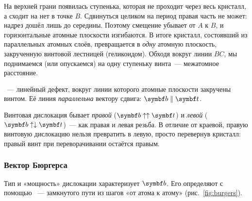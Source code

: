 На верхней грани появилась ступенька, которая не проходит через весь
кристалл, а сходит на нет в точке $B$. Сдвинуться целиком на период
правая часть не может: надрез дошёл лишь до середины. Поэтому смещение
убывает от $A$ к $B$, и горизонтальные атомные плоскости изгибаются. В
итоге кристалл, состоявший из параллельных атомных слоёв, превращается
в \emph{одну} атомную плоскость, закрученную винтовой лестницей
(геликоидом). Обходя вокруг линии $BC$, мы поднимаемся (или опускаемся)
на одну ступеньку винта~— межатомное расстояние.

\begin{opredelenie}
~— линейный дефект, вокруг линии которого
атомные плоскости закручены винтом. Её линия \emph{параллельна} вектору
сдвига: $\vb b\parallel\vb t$.
\end{opredelenie}

Винтовая дислокация бывает \emph{правой} ($\vb b\uparrow\uparrow\vb t$)
и \emph{левой} ($\vb b\uparrow\downarrow\vb t$)~— как правая и левая
резьба. В отличие от краевой, правую винтовую дислокацию нельзя
превратить в левую, просто перевернув кристалл: правый винт при
переворачивании остаётся правым.

\subsubsection{Вектор Бюргерса}

Тип и «мощность» дислокации характеризует 
$\vb b$. Его определяют с помощью ~— замкнутого
пути из шагов «от атома к атому» (рис.~\ref{fig:burgers}).

